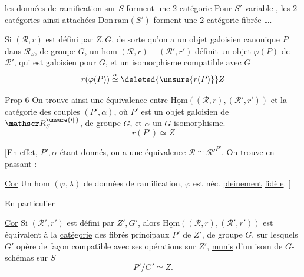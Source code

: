 les données de ramification sur $S$ forment une 2-catégorie  Pour $S'$ variable , les 2-catégories ainsi attachées $\mathrm{Don\,ram}(S')$ forment une 2-catégorie fibrée \ldots.

Si $(\mathscr R,r)$ est défini par $Z,G$, de sorte qu'on a un objet galoisien canonique $P$ dans $\mathscr R_S$, de groupe $G$, un  hom $(\mathscr R,r)-(\mathscr R',r')$ définit un objet $\varphi(P)$ de $\mathscr R'$, qui est galoisien  pour $G$, et un isomorphisme \uline{compatible avec} $G$
\[
r(\varphi(P))\overset{\alpha}{\simeq}\deleted{\unsure{r(P)}} Z
\]

\uline{Prop} 6 On trouve ainsi une équivalence entre $\underline{\mathrm{Hom}}((\mathscr R,r),(\mathscr R',r'))$ et la catégorie des couples $(P',\alpha)$, où $P'$ est un objet galoisien de $\mathscr R^{\unsure{\prime|\,}}_S$, de groupe $G$, et $\alpha$ un $G$-isomorphisme.
\[
r(P')\simeq Z
\]

[En effet, $P',\alpha$ étant donnés, on a une \uline{équivalence} $\mathscr R\cong{\mathscr R'}^{P'}$. On trouve en passant  :

\uline{Cor}  Un hom $(\varphi,\lambda)$ de données de ramification,  $\varphi$ est néc. \uline{pleinement} \uline{fidèle}. ]

En particulier

\uline{Cor}  Si $(\mathscr R',r')$ est défini par $Z',G'$, alors $\underline{\mathrm{Hom}}((\mathscr R,r),(\mathscr R',r'))$ est équivalent à la \uline{catégorie} des fibrés principaux $P'$ de $Z'$, de groupe $G$, sur lesquels $G'$ opère  de façon compatible avec ses opérations sur $Z'$, \uline{munis} d'un isom de $G$-schémas sur $S$
\[
P'/G'\simeq Z.
\]
